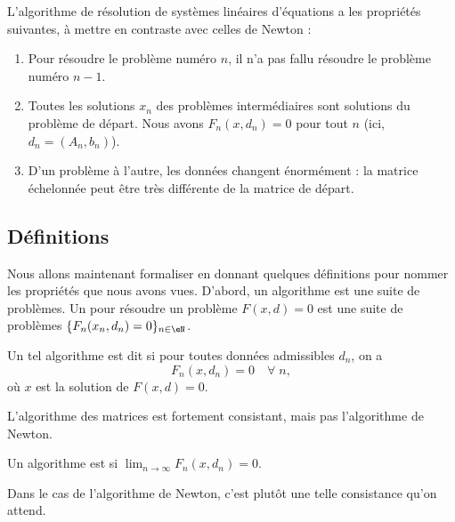 L'algorithme de résolution de systèmes linéaires d'équations a les propriétés suivantes, à mettre en contraste avec celles de Newton :
\begin{enumerate}

	\item
		Pour résoudre le problème numéro $n$, il n'a pas fallu résoudre le problème numéro $n-1$.
	\item
		Toutes les solutions $x_n$ des problèmes intermédiaires sont solutions du problème de départ. Nous avons $F_n(x,d_n)=0$ pour tout $n$ (ici, $d_n=(A_n,b_n)$).
	\item
		D'un problème à l'autre, les données changent énormément : la matrice échelonnée peut être très différente de la matrice de départ.

\end{enumerate}

\subsection{Définitions}

	Nous allons maintenant formaliser en donnant quelques définitions pour nommer les propriétés que nous avons vues. D'abord, un algorithme est une suite de problèmes. Un  pour résoudre un problème $F(x,d)=0$ est une suite de problèmes $\{F_n(x_n,d_n)=0\}_{n\in\eN}$.

\begin{definition}
	Un tel algorithme est dit   si pour toutes données admissibles $d_n$, on a
	\begin{equation}
		F_n(x,d_n)=0\quad\forall \;n,
	\end{equation}
	où $x$ est la solution de $F(x,d)=0$.
\end{definition}
L'algorithme des matrices est fortement consistant, mais pas l'algorithme de Newton.

\begin{definition}
	Un algorithme est  si $\lim_{n\to\infty}F_n(x,d_n)=0$.
\end{definition}
Dans le cas de l'algorithme de Newton, c'est plutôt une telle consistance qu'on attend.

